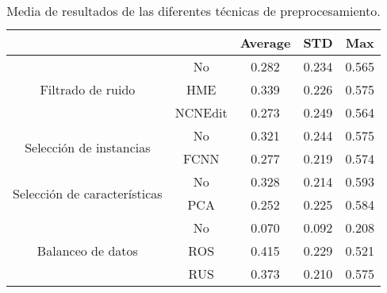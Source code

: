 \begin{table}[t]
    \centering
    \begin{tabular}{cc|c|c|c|}
    \cline{3-5}
    \multicolumn{1}{l}{\textbf{}} & \textbf{} & \multicolumn{1}{c|}{\textbf{Average}} & \multicolumn{1}{c|}{\textbf{STD}} & \textbf{Max} \\ \hline
    \multicolumn{1}{|c|}{\multirow{3}{*}{Filtrado de ruido}}       & No        & 0.282  & 0.234
    & 0.565    \\ \cline{2-5} 
    \multicolumn{1}{|c|}{}  & HME       & 0.339   & 0.226    & 0.575        \\ \cline{2-5} 
    \multicolumn{1}{|c|}{}  & NCNEdit   & 0.273   & 0.249    & 0.564        \\ \hline
    \multicolumn{1}{|c|}{\multirow{2}{*}{Selección de instancias}} & No        & 0.321  & 0.244    & 0.575        \\ \cline{2-5} 
    \multicolumn{1}{|c|}{}  & FCNN      & 0.277   & 0.219    & 0.574        \\ \hline
    \multicolumn{1}{|c|}{\multirow{2}{*}{Selección de características}} & No        & 0.328  & 0.214    & 0.593        \\ \cline{2-5} 
    \multicolumn{1}{|c|}{}  & PCA      & 0.252    & 0.225    & 0.584        \\ \hline
    \multicolumn{1}{|c|}{\multirow{3}{*}{Balanceo de datos}}       & No        & 0.070  & 0.092    & 0.208        \\ \cline{2-5} 
    \multicolumn{1}{|c|}{}  & ROS       & 0.415   & 0.229    & 0.521        \\ \cline{2-5} 
    \multicolumn{1}{|c|}{}  & RUS       & 0.373   & 0.210    & 0.575        \\ \hline
    \end{tabular}
    \caption{Media de resultados de las diferentes técnicas de preprocesamiento.}
    \label{avg}
\end{table}

